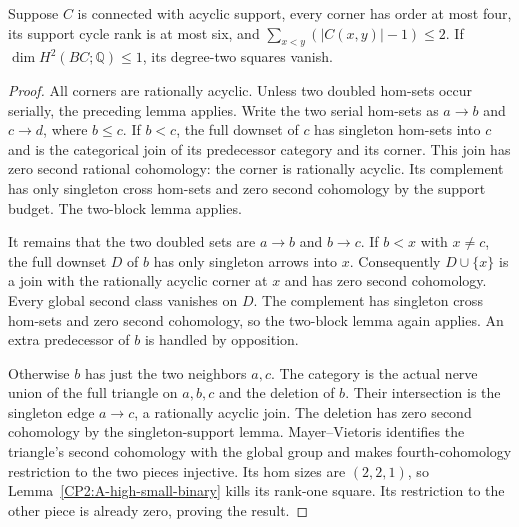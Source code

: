 \begin{lemma}
\label{CP2:A-high-two-parallel}
Suppose $C$ is connected with acyclic support, every
corner has order at most four, its support cycle rank
is at most six, and
$\sum_{x<y}(|C(x,y)|-1)\leq2$.  If
$\dim H^2(BC;\mathbb Q)\leq1$, its degree-two squares vanish.
\end{lemma}
\begin{proof}
All corners are rationally acyclic.  Unless two doubled
hom-sets occur serially, the preceding lemma applies.
Write the two serial hom-sets as $a\to b$ and $c\to d$,
where $b\leq c$.  If $b<c$, the full downset of $c$ has
singleton hom-sets into $c$ and is the categorical join
of its predecessor category and its corner.  This join
has zero second rational cohomology: the corner is
rationally acyclic.  Its complement has only singleton
cross hom-sets and zero second cohomology by the support
budget.  The two-block lemma applies.

It remains that the two doubled sets are $a\to b$ and
$b\to c$.  If $b<x$ with $x\ne c$, the full downset
$D$ of $b$ has only singleton arrows into $x$.
Consequently $D\cup\{x\}$ is a join with the rationally
acyclic corner at $x$ and has zero second cohomology.
Every global second class vanishes on $D$.  The complement
has singleton cross hom-sets and zero second cohomology,
so the two-block lemma again applies.  An extra predecessor
of $b$ is handled by opposition.

Otherwise $b$ has just the two neighbors $a,c$.  The
category is the actual nerve union of the full triangle
on $a,b,c$ and the deletion of $b$.  Their intersection
is the singleton edge $a\to c$, a rationally acyclic
join.  The deletion has zero second cohomology by the
singleton-support lemma.  Mayer--Vietoris identifies
the triangle's second cohomology with the global group
and makes fourth-cohomology restriction to the two
pieces injective.  Its hom sizes are $(2,2,1)$, so
Lemma~\ref{CP2:A-high-small-binary} kills its rank-one
square.  Its restriction to the other piece is already
zero, proving the result.
\end{proof}


